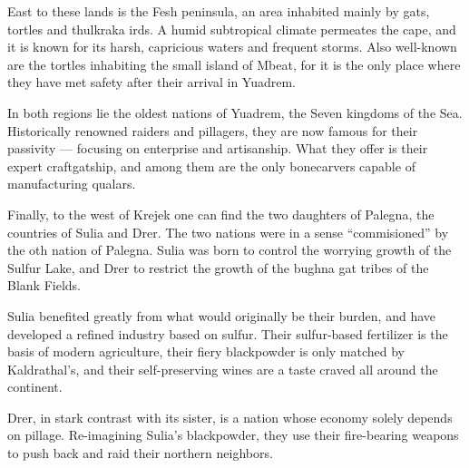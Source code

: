 East to these lands is the Fesh peninsula, an area inhabited mainly by gats, tortles and thulkraka irds.
A humid subtropical climate permeates the cape, and it is known for its harsh, capricious waters and frequent storms.
Also well-known are the tortles inhabiting the small island of Mbeat, for it is the only place where they have met safety after their arrival in Yuadrem.

In both regions lie the oldest nations of Yuadrem, the Seven kingdoms of the Sea.
Historically renowned raiders and pillagers, they are now famous for their passivity --- focusing on enterprise and artisanship.
What they offer is their expert craftgatship, and among them are the only bonecarvers capable of manufacturing qualars.

Finally, to the west of Krejek one can find the two daughters of Palegna, the countries of Sulia and Drer.
The two nations were in a sense ``commisioned'' by the oth nation of Palegna.
Sulia was born to control the worrying growth of the Sulfur Lake, and Drer to restrict the growth of the bughna gat tribes of the Blank Fields.

Sulia benefited greatly from what would originally be their burden, and have developed a refined industry based on sulfur.
Their sulfur-based fertilizer is the basis of modern agriculture, their fiery blackpowder is only matched by Kaldrathal's, and their self-preserving wines are a taste craved all around the continent.

Drer, in stark contrast with its sister, is a nation whose economy solely depends on pillage.
Re-imagining Sulia's blackpowder, they use their fire-bearing weapons to push back and raid their northern neighbors.
